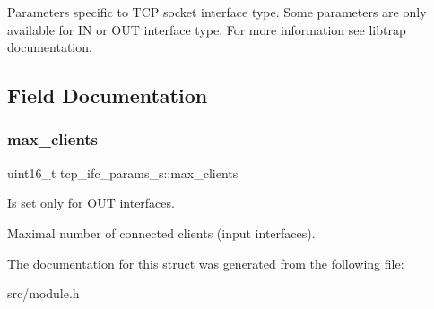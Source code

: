 Parameters specific to T\+CP socket interface type. Some parameters are only available for IN or O\+UT interface type. For more information see libtrap documentation. 

\subsection{Field Documentation}
\mbox{\label{structtcp__ifc__params__s_a8a7e6e32c2393d4c04698813e70112e3}} 
\subsubsection{\texorpdfstring{max\+\_\+clients}{max\_clients}}
{\footnotesize\ttfamily uint16\+\_\+t tcp\+\_\+ifc\+\_\+params\+\_\+s\+::max\+\_\+clients}



Is set only for O\+UT interfaces. 

Maximal number of connected clients (input interfaces). 

The documentation for this struct was generated from the following file\+:\begin{DoxyCompactItemize}
\item 
src/module.\+h\end{DoxyCompactItemize}
